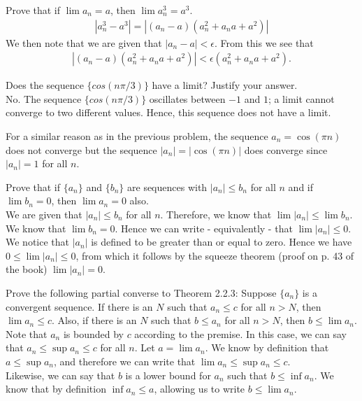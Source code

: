 \documentclass[12pt]{book}
\newenvironment{exercise}[2][Exercise]{\begin{trivlist}
\item[\hskip \labelsep {\bfseries #1}\hskip \labelsep {\bfseries #2.}]}{\end{trivlist}}
\begin{document}
\begin{exercise}{2.2.8}
Prove that if $\lim a_n = a$, then $\lim a_n^3 = a^3$.
	\begin{align*}
	|a_n^3 - a^3 | = |(a_n - a) (a_n^2 + a_n a + a^2)|
	\end{align*}
We then note that we are given that $|a_n - a| < \epsilon$. From this we see that
	\begin{align*}
	|(a_n - a) (a_n^2 + a_n a + a^2)| < \epsilon (a_n^2 + a_n a + a^2).
	\end{align*}
\end{exercise}


\begin{exercise}{2.2.9}
Does the sequence $\{cos(n \pi /3)\}$ have a limit? Justify your answer. \\

No. The sequence $\{cos(n \pi /3)\}$ oscillates between $-1$ and $1$; a limit cannot converge to two different values. Hence, this sequence does not have a limit.
\end{exercise}

\begin{exercise}{2.2.10}
For a similar reason as in the previous problem, the sequence $a_n = \cos (\pi n)$ does not converge but the sequence $|a_n| = |\cos (\pi n)|$ does converge since $|a_n| = 1$ for all $n$.
\end{exercise}

\begin{exercise}{2.2.11}
Prove that if $\{a_n\}$ and $\{b_n\}$ are sequences with $|a_n| \leq b_n$ for all $n$ and if $\lim b_n =0$, then $\lim a_n = 0$ also. \\

We are given that $ |a_n|  \leq b_n$ for all $n$. Therefore, we know that $ \lim |a_n| \leq \lim b_n$. We know that $\lim b_n = 0$. Hence we can write - equivalently - that $\lim |a_n| \leq 0$. We notice that $|a_n|$ is defined to be greater than or equal to zero. Hence we have $0 \leq \lim |a_n| \leq 0$, from which it follows by the squeeze theorem (proof on p. 43 of the book) $\lim |a_n| = 0$.
\end{exercise}


\begin{exercise}{2.2.12}
Prove the following partial converse to Theorem 2.2.3: Suppose $\{a_n\}$ is a convergent sequence. If there is an $N$ such that $a_n \leq c$ for all $n > N$, then $\lim a_n \leq c$. Also, if there is an $N$ such that $b \leq a_n$ for all $n > N$, then $b \leq \lim a_n$. \\

Note that ${a_n}$ is bounded by $c$ according to the premise. In this case, we can say that $a_n \leq \sup a_n \leq c$ for all $n$. Let $ a = \lim a_n$. We know by definition that $a \leq \sup a_n$, and therefore we can write that $\lim a_n \leq \sup a_n \leq c$. \\
Likewise, we can say that $b$ is a lower bound for $a_n$ such that $b \leq \inf a_n$. We know that by definition $\inf a_n \leq a$, allowing us to write $b \leq \lim a_n$.
\end{exercise}
\end{document}
